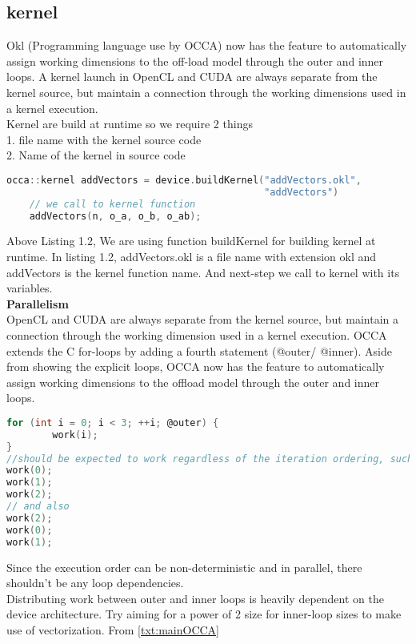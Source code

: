 \subsection{kernel}
Okl (Programming language use by OCCA) now has the feature to automatically assign working dimensions to the off-load model through the outer and inner loops. A kernel launch in OpenCL and CUDA are always separate from the kernel source, but maintain a connection through the working dimensions used in a kernel execution.\\
Kernel are build at runtime so we require 2 things\\
1. file name with the kernel source code \\
2. Name of the kernel in source code\\
\begin{lstlisting}[language=C, caption=call to kernel function]
	occa::kernel addVectors = device.buildKernel("addVectors.okl",
                                             "addVectors")
    // we call to kernel function
    addVectors(n, o_a, o_b, o_ab);
\end{lstlisting}
Above Listing 1.2, We are using function buildKernel for building kernel at runtime. In listing 1.2, addVectors.okl is a file name with extension okl and addVectors is the kernel function name. And next-step we call to kernel with its variables.\\
\textbf{Parallelism}\\
\label{txt:innerOuterloop}
OpenCL and CUDA are always separate from the kernel source, but maintain a connection through the working dimension used in a kernel execution. OCCA extends the C for-loops by adding a fourth statement (@outer/ @inner). Aside from showing the explicit loops, OCCA now has the feature to automatically assign working dimensions to the offload model through the outer and inner loops.
\begin{lstlisting}[language=C, caption=outer loop example]
	for (int i = 0; i < 3; ++i; @outer) {
  		work(i);
}
//should be expected to work regardless of the iteration ordering, such as:
work(0);
work(1);
work(2);
// and also 
work(2);
work(0);
work(1);
\end{lstlisting}
Since the execution order can be non-deterministic and in parallel, there shouldn't be any loop dependencies.\\
Distributing work between outer and inner loops is heavily dependent on the device architecture. Try aiming for a power of 2 size for inner-loop sizes to make use of vectorization. From \ref{txt:mainOCCA}
